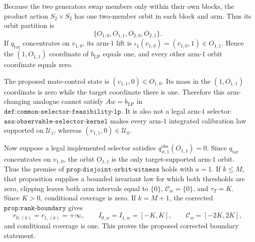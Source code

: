 Because the two generators swap members only within their own blocks, the product action \(S_2\times S_2\) has one two-member orbit in each block and arm. Thus its orbit partition is
\[\{O_{1,0},O_{1,1},O_{2,0},O_{2,1}\}.\]
If \(q_{\mathrm{tar}}\) concentrates on \(v_{1,0}\), its arm-\(1\) lift is \(\iota_1(v_{1,0})=(v_{1,0},1)\in O_{1,1}\). Hence the \((1,O_{1,1})\) coordinate of \(b_{\mathrm{LP}}\) equals one, and every other arm-\(1\) orbit coordinate equals zero.

The proposed mate-control state is \((v_{1,1},0)\in O_{1,0}\). Its mass in the \((1,O_{1,1})\) coordinate is zero while the target coordinate there is one. Therefore this arm-changing analogue cannot satisfy \(Aw=b_{\mathrm{LP}}\) in \(\texttt{def:common-selector-feasibility-lp}\). It is also not a legal arm-\(1\) selector: \(\texttt{ass:observable-selector-kernel}\) makes every arm-\(1\) integrated calibration law supported on \(\mathcal U_1\), whereas \((v_{1,1},0)\in\mathcal U_0\).

Now suppose a legal implemented selector satisfies \(q^{\mathrm{obs}}_{w,1}(O_{1,1})=0\). Since \(q_{\mathrm{tar}}\) concentrates on \(v_{1,0}\), the orbit \(O_{1,1}\) is the only target-supported arm-\(1\) orbit. Thus the premise of \(\texttt{prop:disjoint-orbit-witness}\) holds with \(a=1\). If \(k\le M\), that proposition supplies a bounded invariant law for which both thresholds are zero, clipping leaves both arm intervals equal to \(\{0\}\), \(\mathcal C_w=\{0\}\), and \(\tau_T=K\). Since \(K>0\), conditional coverage is zero. If \(k=M+1\), the corrected \(\texttt{prop:rank-boundary}\) gives
\[r_{0,(k)}=r_{1,(k)}=+\infty,\qquad I_{0,w}=I_{1,w}=[-K,K],\qquad \mathcal C_w=[-2K,2K],\]
and conditional coverage is one. This proves the proposed corrected boundary statement.